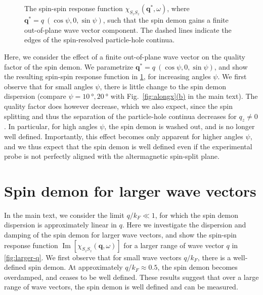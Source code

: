 \documentclass[aps,prb,reprint,twocolumns,superscriptaddress,nofootinbib]{revtex4-2}
\DeclareMathOperator{\Imm}{Im}
\newcommand{\kF}{k_{F}}
\newcommand{\subfigref}[2]{Fig.~\hyperref[#1]{\ref*{#1}#2}}
\begin{document}
\begin{figure}
		\caption{The spin-spin response function $\chi_{S_zS_z}(\bm q^*,\omega)$, where $\bm q^*=q\ (\cos\psi,0,\sin\psi)$, such that the spin demon gains a finite out-of-plane wave vector component. The dashed lines indicate the edges of the spin-resolved particle-hole continua. \label{fig:oop}}
	\end{figure}
	
	Here, we consider the effect of a finite out-of-plane wave vector on the quality factor of the spin demon. We parametrize $\bm q^* = q\ (\cos\psi,0,\sin\psi)$, and show the resulting spin-spin response function in \cref{fig:oop}, for increasing angles $\psi$. We first observe that for small angles $\psi$, there is little change to the spin demon dispersion (compare $\psi=\SI{10}{\degree},\SI{20}{\degree}$ with \subfigref{fig:alongx}{(b)} in the main text). The quality factor does however decrease, which we also expect, since the spin splitting and thus the separation of the particle-hole continua decreases for $q_z\neq0$. In particular, for high angles $\psi$, the spin demon is washed out, and is no longer well defined. Importantly, this effect becomes only apparent for higher angles $\psi$, and we thus expect that the spin demon is well defined even if the experimental probe is not perfectly aligned with the altermagnetic spin-split plane.
	
	
	
	\section{Spin demon for larger wave vectors}
	In the main text, we consider the limit $q/\kF\ll1$, for which the spin demon dispersion is approximately linear in $q$. Here we investigate the dispersion and damping of the spin demon for larger wave vectors, and show the spin-spin response function $\Imm[\chi_{S_zS_z}(\bm q,\omega)]$ for a larger range of wave vector $q$ in \cref{fig:larger-q}. We first observe that for small wave vectors $q/\kF$, there is a well-defined spin demon. At approximately $q/\kF\approx 0.5$, the spin demon becomes overdamped, and ceases to be well defined. These results suggest that over a large range of wave vectors, the spin demon is well defined and can be measured.
	
\end{document}
